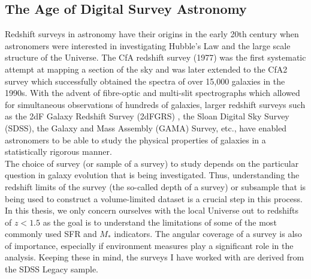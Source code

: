 \subsection{The Age of Digital Survey Astronomy}

Redshift surveys in astronomy have their origins in the early 20th century when astronomers were interested in investigating Hubble's Law and the large scale structure of the Universe. The CfA redshift survey (1977) was the first systematic attempt at mapping a section of the sky and was later extended to the CfA2 survey which successfully obtained the spectra of over 15,000 galaxies in the 1990s. With the advent of fibre-optic and multi-slit spectrographs which allowed for simultaneous observations of hundreds of galaxies, larger redshift surveys such as the 2dF Galaxy Redshift Survey (2dFGRS) , the Sloan Digital Sky Survey (SDSS), the Galaxy and Mass Assembly (GAMA) Survey, etc., have enabled astronomers to be able to study the physical properties of galaxies in a statistically rigorous manner.\\

The choice of survey (or sample of a survey) to study depends on the particular question in galaxy evolution that is being investigated. Thus, understanding the redshift limits of the survey (the so-called depth of a survey) or subsample that is being used to construct a volume-limited dataset is a crucial step in this process. In this thesis, we only concern ourselves with the local Universe out to redshifts of $z < 1.5$ as the goal is to understand the limitations of some of the most commonly used SFR and $M_{*}$ indicators. The angular coverage of a survey is also of importance, especially if environment measures play a significant role in the analysis. Keeping these in mind, the surveys I have worked with are derived from the SDSS Legacy sample.\\

